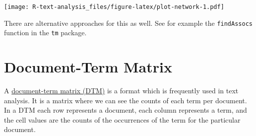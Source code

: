 \documentclass[]{book}
\newenvironment{Shaded}{\begin{snugshade}}{\end{snugshade}}
\newcommand{\CommentTok}[1]{\textcolor[rgb]{0.56,0.35,0.01}{\textit{#1}}}
\newcommand{\DataTypeTok}[1]{\textcolor[rgb]{0.13,0.29,0.53}{#1}}
\newcommand{\DecValTok}[1]{\textcolor[rgb]{0.00,0.00,0.81}{#1}}
\newcommand{\FloatTok}[1]{\textcolor[rgb]{0.00,0.00,0.81}{#1}}
\newcommand{\KeywordTok}[1]{\textcolor[rgb]{0.13,0.29,0.53}{\textbf{#1}}}
\newcommand{\NormalTok}[1]{#1}
\newcommand{\OperatorTok}[1]{\textcolor[rgb]{0.81,0.36,0.00}{\textbf{#1}}}
\newcommand{\OtherTok}[1]{\textcolor[rgb]{0.56,0.35,0.01}{#1}}
\newcommand{\StringTok}[1]{\textcolor[rgb]{0.31,0.60,0.02}{#1}}
\begin{document}
\begin{Shaded}
\end{Shaded}

\texttt{[image: R-text-analysis\_files/figure-latex/plot-network-1.pdf]}

There are alternative approaches for this as well. See for example the \texttt{findAssocs} function in the \texttt{tm} package.

\hypertarget{document-term-matrix}{%
\section{Document-Term Matrix}\label{document-term-matrix}}

A \href{https://en.wikipedia.org/wiki/Document-term_matrix}{document-term matrix (DTM)} is a format which is frequently used in text analysis. It is a matrix where we can see the counts of each term per document. In a DTM each row represents a document, each column represents a term, and the cell values are the counts of the occurrences of the term for the particular document.
\end{document}

